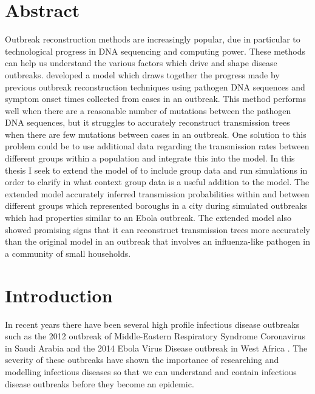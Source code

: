 \documentclass[11pt,a4paper]{report}
\begin{document}
\chapter*{Abstract}
\thispagestyle{empty}
Outbreak reconstruction methods are increasingly popular, due in particular to technological progress in DNA sequencing and computing power. These methods can help us understand the various factors which drive and shape disease outbreaks. \citet{outbrkr} developed a model which draws together the progress made by previous outbreak reconstruction techniques using pathogen DNA sequences and symptom onset times collected from cases in an outbreak. This method performs well when there are a reasonable number of mutations between the pathogen DNA sequences, but it struggles to accurately reconstruct transmission trees when there are few mutations between cases in an outbreak. One solution to this problem could be to use additional data regarding the transmission rates between different groups within a population and integrate this into the model. In this thesis I seek to extend the model of \citet{outbrkr} to include group data and run simulations in order to clarify in what context group data is a useful addition to the model. The extended model accurately inferred transmission probabilities within and between different groups which represented boroughs in a city during simulated outbreaks which had properties similar to an Ebola outbreak. The extended model also showed promising signs that it can reconstruct transmission trees more accurately than the original model in an outbreak that involves an influenza-like pathogen in a community of small households.

\newpage

\tableofcontents
\pagestyle{plain}
\newpage


\chapter{Introduction}
In recent years there have been several high profile infectious disease outbreaks such as the 2012 outbreak of Middle-Eastern Respiratory Syndrome Coronavirus in Saudi Arabia \citep{MERS} and the 2014 Ebola Virus Disease outbreak in West Africa \citep{Ebola14}. The severity of these outbreaks have shown the importance of researching and modelling infectious diseases so that we can understand and contain infectious disease outbreaks before they become an epidemic.
\end{document}
